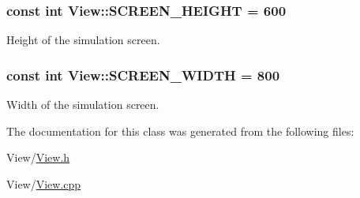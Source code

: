 \subsubsection[{S\+C\+R\+E\+E\+N\+\_\+\+H\+E\+I\+G\+H\+T}]{\setlength{\rightskip}{0pt plus 5cm}const int View\+::\+S\+C\+R\+E\+E\+N\+\_\+\+H\+E\+I\+G\+H\+T = 600\hspace{0.3cm}{\ttfamily [static]}}\label{class_view_a27d60d1f32f4f86745aedd73eecaaece}
Height of the simulation screen. \hypertarget{class_view_a49d4babbeaa66af838d11cb5139becca}{}
\subsubsection[{S\+C\+R\+E\+E\+N\+\_\+\+W\+I\+D\+T\+H}]{\setlength{\rightskip}{0pt plus 5cm}const int View\+::\+S\+C\+R\+E\+E\+N\+\_\+\+W\+I\+D\+T\+H = 800\hspace{0.3cm}{\ttfamily [static]}}\label{class_view_a49d4babbeaa66af838d11cb5139becca}
Width of the simulation screen. 

The documentation for this class was generated from the following files\+:\begin{DoxyCompactItemize}
\item 
View/\hyperlink{_view_8h}{View.\+h}\item 
View/\hyperlink{_view_8cpp}{View.\+cpp}\end{DoxyCompactItemize}
